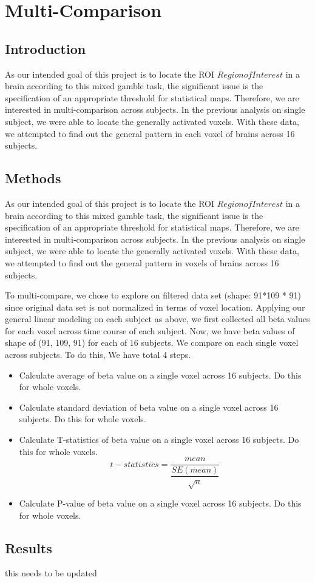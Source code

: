 \section{Multi-Comparison}

\subsection{Introduction}
As our intended goal of this project is to locate the ROI \(Region of Interest\) in a brain according to this mixed gamble task, the significant issue is the specification of an appropriate threshold for statistical maps. Therefore, we are interested in multi-comparison across subjects. In the previous analysis on single subject, we were able to locate the generally activated voxels. With these data, we attempted to find out the general pattern in each voxel of brains across 16 subjects. 

\subsection{Methods}
As our intended goal of this project is to locate the ROI \(Region of Interest\) in a brain according to this mixed gamble task, the significant issue is the specification of an appropriate threshold for statistical maps. Therefore, we are interested in multi-comparison across subjects. In the previous analysis on single subject, we were able to locate the generally activated voxels. With these data, we attempted to find out the general pattern in voxels of brains across 16 subjects. 

To multi-compare, we chose to explore on filtered data set (shape: 91*109 * 91) since original data set is not normalized in terms of voxel location. Applying our general linear modeling on each subject as above, we first collected all beta values for each voxel across time course of each subject. Now, we have beta values of shape of (91, 109, 91) for each of 16 subjects. We compare on each single voxel across subjects. To do this, We have total 4 steps.

\begin{itemize}
\item Calculate average of beta value on a single voxel across 16 subjects. Do this for whole voxels.\\
\item Calculate standard deviation of beta value on a single voxel across 16 subjects. Do this for whole voxels. \\
\item Calculate T-statistics of beta value on a single voxel across 16 subjects. Do this for whole voxels.\\
\[ 
  t-statistics = \dfrac{mean}{\dfrac{SE(mean)}{\sqrt{n}}}
\]

\item Calculate P-value of beta value on a single voxel across 16 subjects. Do this for whole voxels. \\
\end{itemize}

\subsection {Results}
this needs to be updated





